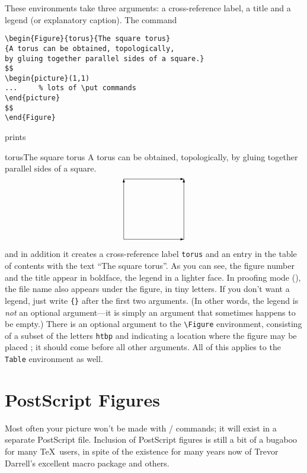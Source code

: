 These environments take three arguments: a cross-reference label, a title and
a legend (or explanatory caption). The command
%
\begin{verbatim}
\begin{Figure}{torus}{The square torus}
{A torus can be obtained, topologically,
by gluing together parallel sides of a square.}
$$
\begin{picture}(1,1)
...     % lots of \put commands
\end{picture}
$$
\end{Figure}
\end{verbatim}
%
prints
%
\begin{Figure}{torus}{The square torus}
{A torus can be obtained, topologically,
by gluing together parallel sides of a square.}
$$
\unitlength=1in
\begin{picture}(1,1)
\put(0,0){\vector(1,0){1}}
\put(0,0){\vector(0,1){1}}
\put(1,0){\vector(0,1){1}}
\put(0,1){\vector(1,0){1}}
\end{picture}
$$
\end{Figure}
%

\noindent
and in addition it creates a cross-reference label \verb+torus+ and an
entry in the table of contents with the text ``The square torus''.
As you can see,
the figure number and the title appear in
boldface, the legend in a lighter face. In proofing mode
(), the file
name also appears under the figure, in tiny letters.  If you don't
want a legend, just write \verb+{}+ after the first two arguments.
(In other words, the legend is {\it not} an optional argument---it is
simply an argument that sometimes happens to be empty.)
There is an optional argument to the \verb+\Figure+ environment, consisting
of a subset of the letters \verb+htbp+ and indicating a location 
where the figure may be placed \cite[176]{Lamport}; it should come
before all other arguments.
All of this applies to the \verb+Table+ environment as well.

\section{PostScript Figures}

Most often your picture won't be made with \latex/ commands; it will
exist in a separate PostScript file.  Inclusion of PostScript figures
is still a bit of a bugaboo for many \TeX\ users, in spite of the
existence for many years now of Trevor Darrell's excellent macro
package  \cite{psfig} and others.

